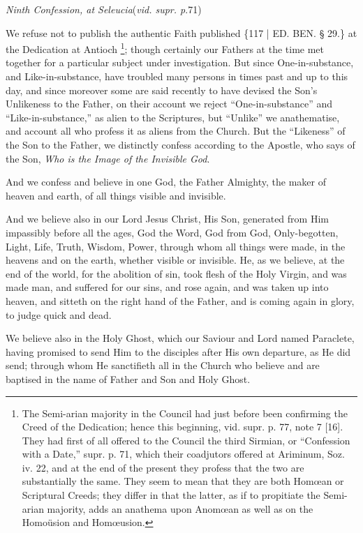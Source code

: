 \emph{Ninth
Confession, at Seleucia}(\emph{vid. supr. p}.\emph{}71)

We refuse not to publish the
authentic Faith published \{117 | ED. BEN.
§ 29.\} at the Dedication at Antioch \footnote{The Semi-arian majority in the Council had just before been confirming
the Creed of the Dedication; hence this beginning, vid. supr. p. 77,
note 7 [16]. They had first of all offered to the Council the third
Sirmian, or ``Confession with a Date,'' supr. p. 71, which their
coadjutors offered at Ariminum, Soz. iv. 22, and at the end of the
present they profess that the two are substantially the same. They
seem to mean that they are both Homœan or Scriptural Creeds; they
differ in that the latter, as if to propitiate the Semi-arian
majority, adds an anathema upon Anomœan as well as on the Homoüsion
and Homœusion.}; though certainly our Fathers at the time met together for a
particular subject under investigation. But since One-in-substance,
and Like-in-substance, have troubled many persons in times past and up
to this day, and since moreover some are said recently to have devised
the Son's Unlikeness to the Father, on their account we reject ``One-in-substance''
and ``Like-in-substance,'' as alien to the Scriptures, but ``Unlike'' we
anathematise, and account all who profess it as aliens from the
Church. But the ``Likeness'' of the Son to the Father, we distinctly
confess according to the Apostle, who says of the Son, \emph{Who is the
Image of the Invisible God}.

And we confess and believe in
one God, the Father Almighty, the maker of heaven and earth, of all
things visible and invisible.

And we believe also in our
Lord Jesus Christ, His Son, generated from Him impassibly before all
the ages, God the Word, God from God, Only-begotten, Light, Life,
Truth, Wisdom, Power, through whom all things were made, in the
heavens and on the earth, whether visible or invisible. He, as we
believe, at the end of the world, for the abolition of sin, took flesh
of the Holy Virgin, and was made man, and suffered for our sins, and
rose again, and was taken up into heaven, and sitteth on the right
hand of the Father, and is coming again in glory, to judge quick and
dead.

We believe also in the Holy
Ghost, which our Saviour and Lord named Paraclete, having promised to
send Him to the disciples after His own departure, as He did send;
through whom He sanctifieth all in the Church who believe and are
baptised in the name of Father and Son and Holy Ghost.

